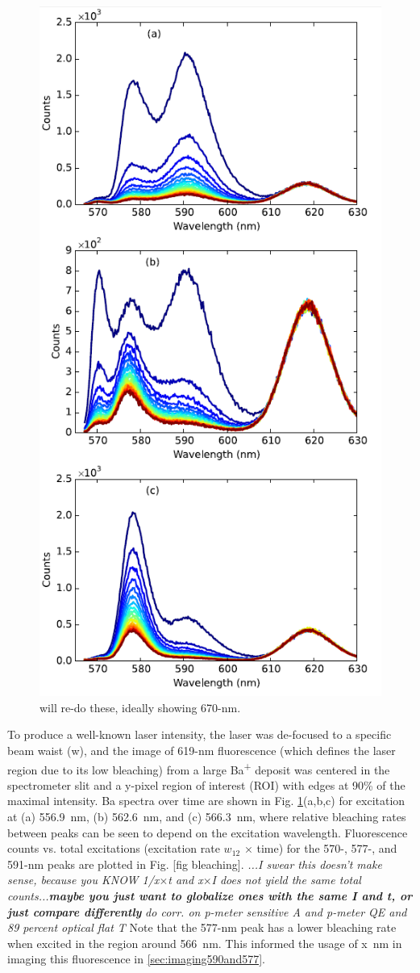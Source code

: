 \begin{figure} %
        \centering
                \includegraphics[width=.5\textwidth]{figures/bleach_spec.png}
                \caption{\color{red}will re-do these, ideally showing 670-nm. \cite{Mong2015}}
\label{fig:specBleach}
\end{figure}

To produce a well-known laser intensity, the laser was de-focused to a specific beam waist (w), and the image of 619-nm fluorescence (which defines the laser region due to its low bleaching) from a large Ba\textsuperscript{+} deposit was centered in the spectrometer slit and a y-pixel region of interest (ROI) with edges at 90\% of the maximal intensity.  Ba spectra over time are shown in Fig. \ref{fig:specBleach}(a,b,c) for excitation at (a) 556.9~nm, (b) 562.6~nm, and (c) 566.3~nm, where relative bleaching rates between peaks can be seen to depend on the excitation wavelength.  Fluorescence counts vs. total excitations (excitation rate $w_{12}$ $\times$ time) for the 570-, 577-, and 591-nm peaks are plotted in Fig. [fig bleaching].  \emph{\color{gray}...I swear this doesn't make sense, because you KNOW 1/x$\times$t and x$\times$I does not yield the same total counts...\textbf{maybe you just want to globalize ones with the same I and t, or just compare differently}} \emph{\color{red}do corr. on p-meter sensitive A and p-meter QE and 89 percent optical flat T}  Note that the 577-nm peak has a lower bleaching rate when excited in the region around {\color{red}566}~nm.  This informed the usage of {\color{red}x}~nm in imaging this fluorescence in \ref{sec:imaging590and577}.

